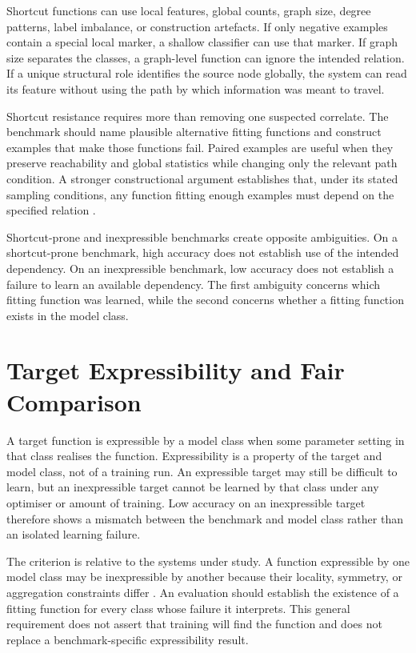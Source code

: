 Shortcut functions can use local features, global counts, graph size, degree patterns, label imbalance, or construction artefacts.
If only negative examples contain a special local marker, a shallow classifier can use that marker.
If graph size separates the classes, a graph-level function can ignore the intended relation.
If a unique structural role identifies the source node globally, the system can read its feature without using the path by which information was meant to travel.

Shortcut resistance requires more than removing one suspected correlate.
The benchmark should name plausible alternative fitting functions and construct examples that make those functions fail.
Paired examples are useful when they preserve reachability and global statistics while changing only the relevant path condition.
A stronger constructional argument establishes that, under its stated sampling conditions, any function fitting enough examples must depend on the specified relation \cite{zhou2025glora}.

Shortcut-prone and inexpressible benchmarks create opposite ambiguities.
On a shortcut-prone benchmark, high accuracy does not establish use of the intended dependency.
On an inexpressible benchmark, low accuracy does not establish a failure to learn an available dependency.
The first ambiguity concerns which fitting function was learned, while the second concerns whether a fitting function exists in the model class.

\section{Target Expressibility and Fair Comparison}

A target function is expressible by a model class when some parameter setting in that class realises the function.
Expressibility is a property of the target and model class, not of a training run.
An expressible target may still be difficult to learn, but an inexpressible target cannot be learned by that class under any optimiser or amount of training.
Low accuracy on an inexpressible target therefore shows a mismatch between the benchmark and model class rather than an isolated learning failure.

The criterion is relative to the systems under study.
A function expressible by one model class may be inexpressible by another because their locality, symmetry, or aggregation constraints differ \cite{barcelo2020logical}.
An evaluation should establish the existence of a fitting function for every class whose failure it interprets.
This general requirement does not assert that training will find the function and does not replace a benchmark-specific expressibility result.

